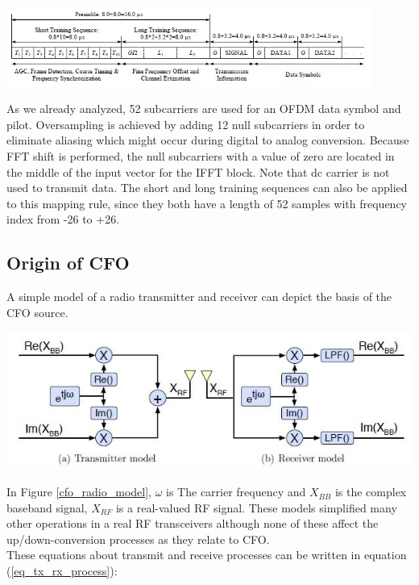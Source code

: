 \begin{center}
\includegraphics[width=12cm]{content/fig/ofdm_frame.JPG}
\label{preamble_ieee}
\end{center}

As we already analyzed, 52 subcarriers are used for an OFDM data symbol and pilot. Oversampling is achieved by adding 12 null subcarriers in order to eliminate aliasing which might occur during digital to analog conversion. Because FFT shift is performed, the null subcarriers with a value of zero are located in the middle of the input vector for the IFFT block. Note that dc carrier is not used to transmit data. The short and long training sequences can also be applied to this mapping rule, since they both have a length of 52 samples with frequency index from -26 to +26.\\


\subsection{Origin of CFO}
A simple model of a radio transmitter and receiver can depict the basis of the CFO source.

\begin{center}
\includegraphics[width=\textwidth]{content/fig/cfo_radio_model.JPG}
\label{cfo_radio_model}
\end{center}

In Figure \ref{cfo_radio_model}, $\omega$ is The carrier frequency and $X_{BB}$ is the complex baseband signal, $X_{RF}$ is
a real-valued RF signal. These models simplified many other operations in a real RF transceivers although none of these affect the up/down-conversion processes as they relate to CFO.\\
These equations about transmit and receive processes can be written in equation (\ref{eq_tx_rx_process}):

